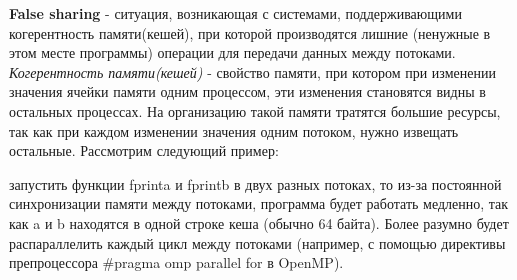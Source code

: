 {	\par\textbf{False sharing} - ситуация, возникающая с системами, поддерживающими когерентность памяти(кешей), при которой производятся лишние (ненужные в этом месте программы) операции для передачи данных между потоками. \textit{Когерентность памяти(кешей)} - свойство памяти, при котором при изменении значения ячейки памяти одним процессом, эти изменения становятся видны в остальных процессах. На организацию такой памяти тратятся большие ресурсы, так как при каждом изменении значения одним потоком, нужно извещать остальные. Рассмотрим следующий пример: 
	\begin{figure}[H]
		
	\end{figure}
	 запустить функции fprint\textunderscore a и fprint\textunderscore b в двух разных потоках, то из-за постоянной синхронизации памяти между потоками, программа будет работать медленно, так как a и b находятся в одной строке кеша (обычно 64 байта). Более разумно будет распараллелить каждый цикл между потоками (например, с помощью директивы препроцессора \#pragma omp parallel for в OpenMP).
}
